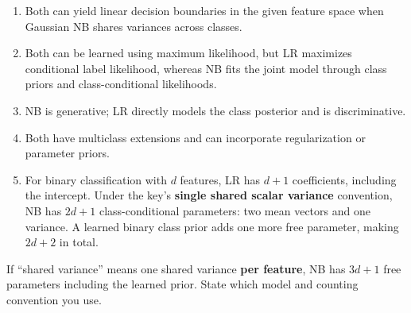 
\begin{enumerate}[start=1]

\item Both can yield linear decision boundaries in the given feature space when Gaussian NB shares variances across classes.

\item Both can be learned using maximum likelihood, but LR maximizes conditional label likelihood, whereas NB fits the joint model through class priors and class-conditional likelihoods.

\item NB is generative; LR directly models the class posterior and is discriminative.

\item Both have multiclass extensions and can incorporate regularization or parameter priors.

\item For binary classification with \(d\) features, LR has \(d+1\) coefficients, including the intercept. Under the key's \textbf{single shared scalar variance} convention, NB has \(2d+1\) class-conditional parameters: two mean vectors and one variance. A learned binary class prior adds one more free parameter, making \(2d+2\) in total.

\end{enumerate}


If “shared variance” means one shared variance \textbf{per feature}, NB has \(3d+1\) free parameters including the learned prior. State which model and counting convention you use.
